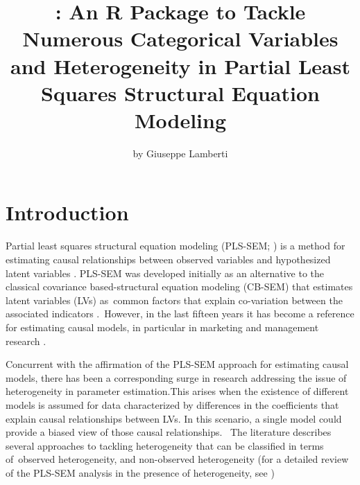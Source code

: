 \title{: An R Package to Tackle Numerous Categorical Variables and Heterogeneity in Partial Least Squares Structural Equation Modeling}
\author{by Giuseppe Lamberti}

\maketitle


\section{Introduction}

Partial least squares structural equation modeling (PLS-SEM; \citealp{Wold85}) is a method for estimating causal relationships between observed variables and hypothesized latent variables \citep{Evermann21}. PLS-SEM was developed initially as an alternative to the classical covariance based-structural equation modeling (CB-SEM) that estimates latent variables (LVs) as common factors that explain co-variation between the associated indicators \citep{Hair17b}. However, in the last fifteen years it has become a reference for estimating causal models, in particular in marketing and management research \citep{Beker22, Sarstedt22a, Sarstedt22b, Hair21, henseler21, Evermann21}.

Concurrent with the affirmation of the PLS-SEM approach for estimating causal models, there has been a corresponding surge in research addressing the issue of heterogeneity in parameter estimation.This arises when the existence of different models is assumed for data characterized by differences in the coefficients that explain causal relationships between LVs. In this scenario, a single model could provide a biased view of those causal relationships.  The literature describes several approaches to tackling heterogeneity that can be classified in terms of observed heterogeneity, and non-observed heterogeneity (for a detailed review of the PLS-SEM analysis in the presence of heterogeneity, see \citealp{Klesel22})

